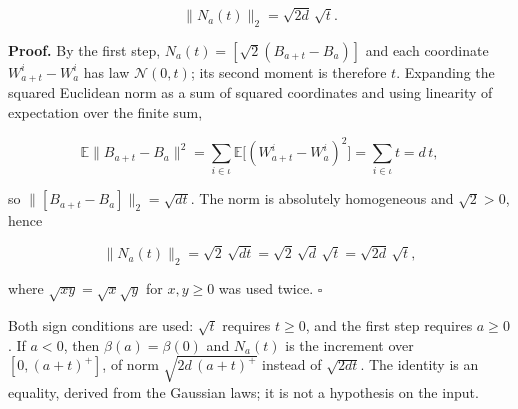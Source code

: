 \documentclass[11pt,a4paper]{article}
\begin{document}
\[\|N_a(t)\|_2=\sqrt{2d}\,\sqrt t.\]


\textbf{Proof.} By the first step, \(N_a(t)=[\sqrt2(B_{a+t}-B_a)]\) and each coordinate \(W^i_{a+t}-W^i_a\) has law \(\mathcal N(0,t)\); its second moment is therefore \(t\). Expanding the squared Euclidean norm as a sum of squared coordinates and using linearity of expectation over the finite sum,


\[\mathbb E\|B_{a+t}-B_a\|^2=\sum_{i\in\iota}\mathbb E\bigl[(W^i_{a+t}-W^i_a)^2\bigr]=\sum_{i\in\iota}t=d\,t,\]


so \(\|[B_{a+t}-B_a]\|_2=\sqrt{dt}\). The norm is absolutely homogeneous and \(\sqrt2>0\), hence


\[\|N_a(t)\|_2=\sqrt2\,\sqrt{dt}=\sqrt2\,\sqrt d\,\sqrt t=\sqrt{2d}\,\sqrt t,\]


where \(\sqrt{xy}=\sqrt x\sqrt y\) for \(x,y\ge0\) was used twice. \(\square\)




Both sign conditions are used: \(\sqrt t\) requires \(t\ge0\), and the first step requires \(a\ge0\). If \(a<0\), then \(\beta(a)=\beta(0)\) and \(N_a(t)\) is the increment over \([0,(a+t)^+]\), of norm \(\sqrt{2d\,(a+t)^+}\) instead of \(\sqrt{2dt}\). The identity is an equality, derived from the Gaussian laws; it is not a hypothesis on the input.
\end{document}

